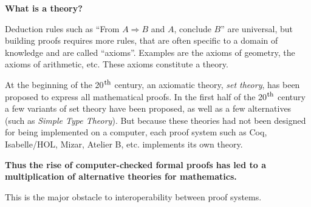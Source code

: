 \begin{shaded}
\vspace*{-0.5cm}
  \begin{center}
{\bf \Large What is a theory?}
\end{center}

Deduction rules such as ``From $A \Rightarrow B$ and $A$, conclude
$B$'' are universal, but building proofs requires more rules, that are
often specific to a domain of knowledge and are called
``axioms''. Examples are the axioms of geometry, the axioms of
arithmetic, etc. These axioms constitute a theory.

At the beginning of the 20$^{\mbox{\footnotesize th}}$ century, an
axiomatic theory, {\em set theory}, has been proposed to express all
mathematical proofs. In the first half of the 20$^{\mbox{\footnotesize
    th}}$ century a few variants of set theory have been proposed, as
well as a few alternatives (such as \emph{Simple Type Theory}).  But
because these theories had not been designed for being implemented on
a computer, each proof system such as Coq, Isabelle/HOL, Mizar,
Atelier B, etc. implements its own theory.  {\bf Thus the rise of
computer-checked formal proofs has led to a multiplication of
alternative theories for mathematics.

This is the major obstacle to interoperability between proof systems.}
\end{shaded}

